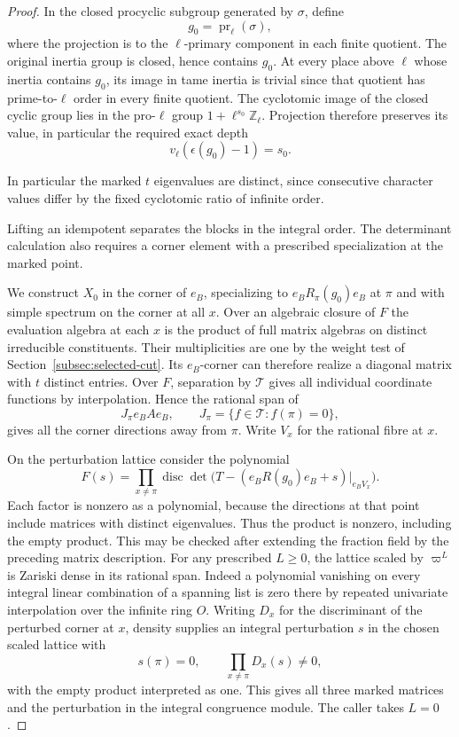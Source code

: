 \begin{proof}
In the closed procyclic subgroup generated by \(\sigma\), define
\[
 g_0=\operatorname{pr}_{\ell}(\sigma),
\]
where the projection is to the \(\ell\)-primary component in each finite quotient. The original
inertia group is closed, hence contains \(g_0\). At every
place above \(\ell\) whose inertia contains \(g_0\), its
image in tame inertia is trivial since that quotient has
prime-to-\(\ell\) order in every finite quotient. The
cyclotomic image of the closed cyclic group lies in the
pro-\(\ell\) group \(1+\ell^{s_0}\mathbb Z_\ell\).
Projection therefore preserves its value, in particular the
required exact depth
\[
 v_\ell(\epsilon(g_0)-1)=s_0.
\]

In particular the marked \(t\) eigenvalues are distinct,
since consecutive character values differ by the fixed
cyclotomic ratio of infinite order.

Lifting an idempotent separates the blocks in the integral order. The determinant calculation also requires a corner element with a prescribed specialization at the marked point.

We construct \(X_0\) in the corner of \(e_B\), specializing
to \(e_BR_\pi(g_0)e_B\) at \(\pi\) and with simple spectrum
on the corner at all \(x\). Over an algebraic closure of
\(F\) the evaluation algebra at each \(x\) is the product
of full matrix algebras on distinct irreducible constituents.
Their multiplicities are one by the weight test of
Section~\ref{subsec:selected-cut}. Its \(e_B\)-corner can
therefore realize a diagonal matrix with \(t\) distinct
entries. Over \(F\), separation by \(\mathcal T\) gives all
individual coordinate functions by interpolation. Hence the
rational span of
\[
  J_\pi e_B A e_B,\qquad
  J_\pi=\{f\in\mathcal T:f(\pi)=0\},
\]
gives all the corner directions away from \(\pi\).
Write \(V_x\) for the rational fibre at \(x\).

On the perturbation lattice consider the polynomial
\[
    F(s)=\prod_{x\ne\pi}\operatorname{disc}
       \det\bigl(T-(e_BR(g_0)e_B+s)|_{e_B V_x}\bigr).
\]
Each factor is nonzero as a polynomial, because the directions
at that point include matrices with distinct eigenvalues.
Thus the product is nonzero, including the empty product. This may be checked after
extending the fraction field by the preceding matrix
description. For any prescribed \(L\ge0\), the lattice scaled
by \(\varpi^L\) is Zariski dense in its rational span. Indeed a
polynomial vanishing on every integral linear combination of
a spanning list is zero there by repeated univariate
interpolation over the infinite ring \(O\). Writing \(D_x\) for the discriminant of the perturbed corner at \(x\), density supplies an integral perturbation \(s\) in the chosen scaled lattice with
\[
 s(\pi)=0,\qquad \prod_{x\ne\pi}D_x(s)\ne0,
\]
with the empty product interpreted as one.
This gives all three marked matrices and the perturbation in
the integral congruence module. The caller takes \(L=0\).


\end{proof}
